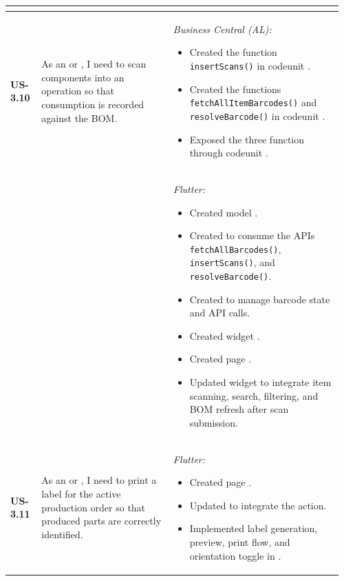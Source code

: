 \begin{longtable}{@{} P{0.09\linewidth} P{0.38\linewidth} P{0.49\linewidth} @{}}
\begin{itemize}[noitemsep, topsep=0pt, partopsep=0pt, leftmargin=*]
	\end{itemize} \\
	\midrule
	\textbf{US-3.10}
	& As an  or , I need to scan
	components into an operation so that consumption is recorded against the BOM.
	& \noindent\textit{Business Central (AL):}
	\begin{itemize}[noitemsep, topsep=0pt, partopsep=0pt, leftmargin=*]
		\item Created the function \texttt{insertScans()} in codeunit .
		\item Created the functions \texttt{fetchAllItemBarcodes()} and \texttt{resolveBarcode()} in codeunit .
		\item Exposed the three function through codeunit .
	\end{itemize}
\\ & &
	\noindent\textit{Flutter:}
	\begin{itemize}[noitemsep, topsep=0pt, partopsep=0pt, leftmargin=*]
		\item Created model .
		\item Created  to consume the APIs \texttt{fetchAllBarcodes()}, \texttt{insertScans()}, and \texttt{resolveBarcode()}.
		\item Created  to manage barcode state and API calls.
		\item Created widget .
		\item Created page .
		\item Updated widget  to integrate item scanning, search, filtering, and BOM refresh after scan submission.
	\end{itemize}\\
	\midrule
	\textbf{US-3.11}
	& As an  or , I need to print a label
	for the active production order so that produced parts are correctly identified.
	& \noindent\textit{Flutter:}
	\begin{itemize}[noitemsep, topsep=0pt, partopsep=0pt, leftmargin=*]
		\item Created page .
		\item Updated  to integrate the  action.
		\item Implemented label generation, preview, print flow, and orientation toggle in .

\end{itemize}
\end{longtable}
